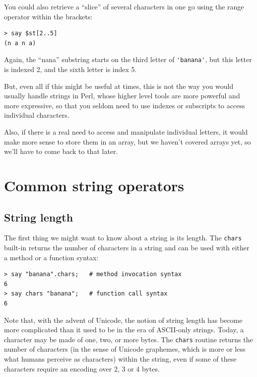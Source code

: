 You could also retrieve a ``slice'' of several characters in 
one go using the range operator within the brackets:

\begin{verbatim}
> say $st[2..5]
(n a n a)
\end{verbatim}
%

Again, the ``nana'' substring starts on the third letter of 
\verb"'banana'", but this letter is indexed 2, and the sixth letter is index 5. 

But, even all if this might be useful at times, this is 
not the way you would usually handle strings in Perl, 
whose higher level tools are more powerful and more 
expressive, so that you seldom need to use indexes or 
subscripts to access individual characters.

Also, if there is a real need to access and manipulate 
individual letters, it would make more sense to store 
them in an array, but we haven't covered arrays yet, so 
we'll have to come back to that later.


\section{Common string operators}

\subsection{String length}

The first thing we might want to know about a string is its length. The {\tt chars} built-in returns the number of characters 
in a string and can be used with either a method or a function 
syntax:
\begin{verbatim}
> say "banana".chars;   # method invocation syntax
6
> say chars "banana";   # function call syntax
6
\end{verbatim}
%

Note that, with the advent of Unicode, the notion of 
string length has 
become more complicated than it used to be in the era
of ASCII-only strings. Today, a character may be made of one,
two, or more bytes. The {\tt chars} routine returns the 
number of characters (in the sense of Unicode graphemes, which
is more or less what humans perceive as characters) within 
the string, even if some of these characters require an 
encoding over 2, 3 or 4 bytes.


